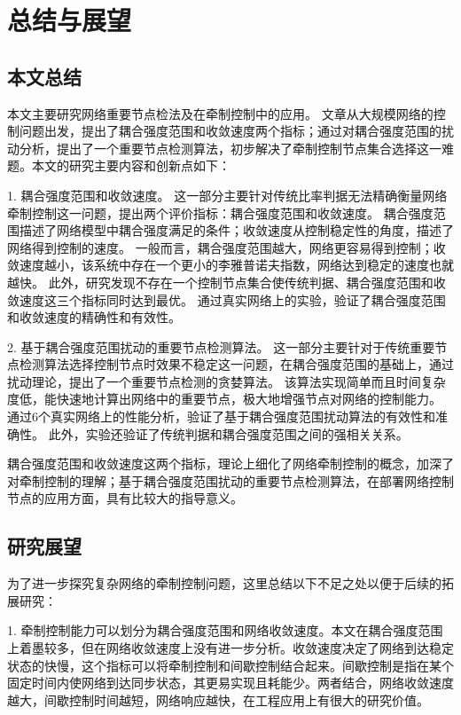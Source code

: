 \section{总结与展望}
\subsection{本文总结}

本文主要研究网络重要节点检法及在牵制控制中的应用。
文章从大规模网络的控制问题出发，提出了耦合强度范围和收敛速度两个指标；通过对耦合强度范围的扰动分析，提出了一个重要节点检测算法，初步解决了牵制控制节点集合选择这一难题。本文的研究主要内容和创新点如下：

1.	耦合强度范围和收敛速度。
这一部分主要针对传统比率判据无法精确衡量网络牵制控制这一问题，提出两个评价指标：耦合强度范围和收敛速度。
耦合强度范围描述了网络模型中耦合强度满足的条件；收敛速度从控制稳定性的角度，描述了网络得到控制的速度。
一般而言，耦合强度范围越大，网络更容易得到控制；收敛速度越小，该系统中存在一个更小的李雅普诺夫指数，网络达到稳定的速度也就越快。
此外，研究发现不存在一个控制节点集合使传统判据、耦合强度范围和收敛速度这三个指标同时达到最优。
通过真实网络上的实验，验证了耦合强度范围和收敛速度的精确性和有效性。


2. 基于耦合强度范围扰动的重要节点检测算法。
这一部分主要针对于传统重要节点检测算法选择控制节点时效果不稳定这一问题，在耦合强度范围的基础上，通过扰动理论，提出了一个重要节点检测的贪婪算法。
该算法实现简单而且时间复杂度低，能快速地计算出网络中的重要节点，极大地增强节点对网络的控制能力。
通过6个真实网络上的性能分析，验证了基于耦合强度范围扰动算法的有效性和准确性。
此外，实验还验证了传统判据和耦合强度范围之间的强相关关系。

耦合强度范围和收敛速度这两个指标，理论上细化了网络牵制控制的概念，加深了对牵制控制的理解；基于耦合强度范围扰动的重要节点检测算法，在部署网络控制节点的应用方面，具有比较大的指导意义。


\subsection{研究展望}

为了进一步探究复杂网络的牵制控制问题，这里总结以下不足之处以便于后续的拓展研究：

1.	牵制控制能力可以划分为耦合强度范围和网络收敛速度。本文在耦合强度范围上着墨较多，但在网络收敛速度上没有进一步分析。收敛速度决定了网络到达稳定状态的快慢，这个指标可以将牵制控制和间歇控制结合起来。间歇控制是指在某个固定时间内使网络到达同步状态，其更易实现且耗能少。两者结合，网络收敛速度越大，间歇控制时间越短，网络响应越快，在工程应用上有很大的研究价值。

